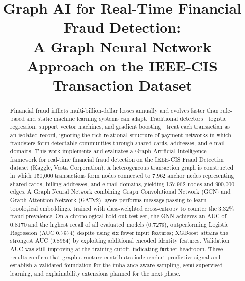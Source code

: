 \documentclass[conference]{IEEEtran}
\begin{document}
\title{Graph AI for Real-Time Financial Fraud Detection:\\
A Graph Neural Network Approach on the IEEE-CIS Transaction Dataset}

\author{
}

\maketitle

\begin{abstract}
Financial fraud inflicts multi-billion-dollar losses annually and evolves
faster than rule-based and static machine learning systems can adapt.
Traditional detectors---logistic regression, support vector machines, and
gradient boosting---treat each transaction as an isolated record, ignoring
the rich relational structure of payment networks in which fraudsters form
detectable communities through shared cards, addresses, and e-mail domains.
This work implements and evaluates a Graph Artificial Intelligence
framework for real-time financial fraud detection on the IEEE-CIS Fraud
Detection dataset (Kaggle, Vesta Corporation). A heterogeneous transaction
graph is constructed in which 150{,}000 transactions form nodes connected
to 7{,}962 anchor nodes representing shared cards, billing addresses, and
e-mail domains, yielding 157{,}962 nodes and 900{,}000 edges. A Graph
Neural Network combining Graph Convolutional Network (GCN) and Graph
Attention Network (GATv2) layers performs message passing to learn
topological embeddings, trained with class-weighted cross-entropy to
counter the 3.32\% fraud prevalence. On a chronological hold-out test set,
the GNN achieves an AUC of 0.8170 and the highest recall of all evaluated
models (0.7278), outperforming Logistic Regression (AUC 0.7974) despite
using six fewer input features; XGBoost attains the strongest AUC (0.8964)
by exploiting additional encoded identity features. Validation AUC was
still improving at the training cutoff, indicating further headroom.
These results confirm that graph structure contributes independent
predictive signal and establish a validated foundation for the
imbalance-aware sampling, semi-supervised learning, and explainability
extensions planned for the next phase.
\end{abstract}
\end{document}
